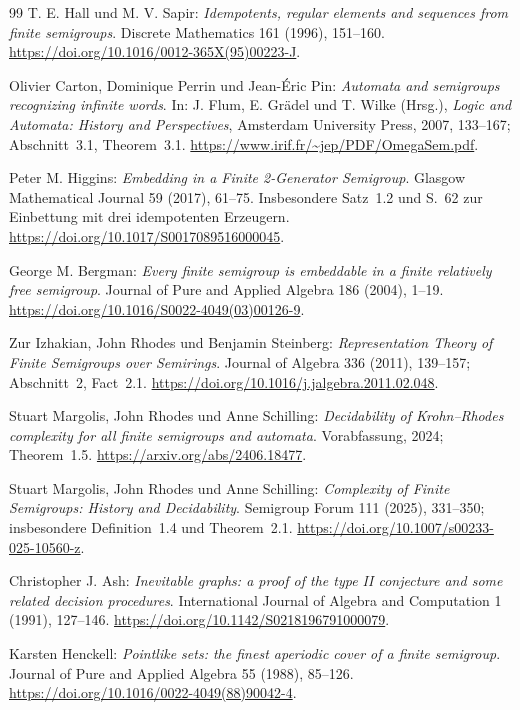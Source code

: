 \begin{thebibliography}{99}
T. E. Hall und M. V. Sapir:
\emph{Idempotents, regular elements and sequences from finite semigroups}.
Discrete Mathematics 161 (1996), 151--160.
\url{https://doi.org/10.1016/0012-365X(95)00223-J}.

Olivier Carton, Dominique Perrin und Jean-Éric Pin:
\emph{Automata and semigroups recognizing infinite words}.
In: J. Flum, E. Grädel und T. Wilke (Hrsg.),
\emph{Logic and Automata: History and Perspectives},
Amsterdam University Press, 2007, 133--167; Abschnitt~3.1, Theorem~3.1.
\url{https://www.irif.fr/~jep/PDF/OmegaSem.pdf}.

Peter M. Higgins: \emph{Embedding in a Finite 2-Generator Semigroup}.
Glasgow Mathematical Journal 59 (2017), 61--75.
Insbesondere Satz~1.2 und S.~62 zur Einbettung mit drei idempotenten Erzeugern.
\url{https://doi.org/10.1017/S0017089516000045}.

George M. Bergman:
\emph{Every finite semigroup is embeddable in a finite relatively free semigroup}.
Journal of Pure and Applied Algebra 186 (2004), 1--19.
\url{https://doi.org/10.1016/S0022-4049(03)00126-9}.

Zur Izhakian, John Rhodes und Benjamin Steinberg:
\emph{Representation Theory of Finite Semigroups over Semirings}.
Journal of Algebra 336 (2011), 139--157; Abschnitt~2, Fact~2.1.
\url{https://doi.org/10.1016/j.jalgebra.2011.02.048}.

Stuart Margolis, John Rhodes und Anne Schilling:
\emph{Decidability of Krohn--Rhodes complexity for all finite semigroups
and automata}. Vorabfassung, 2024; Theorem~1.5.
\url{https://arxiv.org/abs/2406.18477}.

Stuart Margolis, John Rhodes und Anne Schilling:
\emph{Complexity of Finite Semigroups: History and Decidability}.
Semigroup Forum 111 (2025), 331--350;
insbesondere Definition~1.4 und Theorem~2.1.
\url{https://doi.org/10.1007/s00233-025-10560-z}.

Christopher J. Ash:
\emph{Inevitable graphs: a proof of the type II conjecture and some
related decision procedures}.
International Journal of Algebra and Computation 1 (1991), 127--146.
\url{https://doi.org/10.1142/S0218196791000079}.

Karsten Henckell:
\emph{Pointlike sets: the finest aperiodic cover of a finite semigroup}.
Journal of Pure and Applied Algebra 55 (1988), 85--126.
\url{https://doi.org/10.1016/0022-4049(88)90042-4}.


\end{thebibliography}
